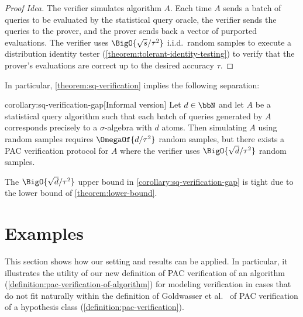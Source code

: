 \documentclass[11pt]{article}
\begin{document}
\begin{proof}[Proof Idea]
	The verifier simulates algorithm $A$. Each time $A$ sends a batch of queries to be evaluated by the statistical query oracle, the verifier sends the queries to the prover, and the prover sends back a vector of purported evaluations. The verifier uses $\BigO{\sqrt{s}/\tau^2}$ i.i.d.\ random samples to execute a distribution identity tester (\cref{theorem:tolerant-identity-testing}) to verify that the prover's evaluations are correct up to the desired accuracy $\tau$.
\end{proof}

In particular, \cref{theorem:sq-verification} implies the following separation:

\begin{repcorollary}{corollary:sq-verification-gap}[Informal version]
	Let $d \in \bbN$ and let $A$ be a statistical query algorithm such that each batch of queries generated by $A$ corresponds precisely to a $\sigma$-algebra with $d$ atoms. Then simulating $A$ using random samples requires $\OmegaOf{d/\tau^2}$ random samples, but there exists a PAC verification protocol for $A$ where the verifier uses $\BigO{\sqrt{d}/\tau^2}$ random samples.
\end{repcorollary}

The $\BigO{\sqrt{d}/\tau^2}$ upper bound in \cref{corollary:sq-verification-gap} is tight due to the lower bound of \cref{theorem:lower-bound}.


\section{Examples}

This section shows how our setting and results can be applied. In particular, it illustrates the utility of our new definition of PAC verification of an algorithm (\cref{definition:pac-verification-of-algorithm}) for modeling verification in cases that do not fit naturally within the definition of Goldwasser et al.\ \cite{GoldwasserRSY21} of PAC verification of a hypothesis class (\cref{definition:pac-verification}).
\end{document}

